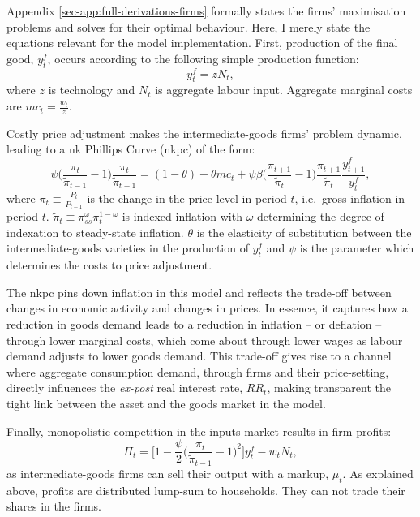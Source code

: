 \documentclass[a4paper,12pt]{article} %
\numberwithin{equation}{section} %
\numberwithin{figure}{section}
\numberwithin{table}{section}
\begin{document}
Appendix \ref{sec-app:full-derivations-firms} formally states the firms' maximisation problems and solves for their optimal behaviour. Here, I merely state the equations relevant for the model implementation. First, production of the final good, $y_t^f$, occurs according to the following simple production function:
\begin{equation}
    y_t^f = z N_t, \label{eq:firms-production}
\end{equation}
where $z$ is technology and $N_t$ is aggregate labour input. Aggregate marginal costs are $mc_t = \frac{w_t}{z}$. 

Costly price adjustment makes the intermediate-goods firms' problem dynamic, leading to a \Gls{nk} Phillips Curve (\Gls{nkpc}) of the form:
\begin{equation}
    \psi \Bigg( \frac{\pi_t}{\tilde{\pi}_{t-1}} - 1 \Bigg) \frac{\pi_t}{\tilde{\pi}_{t-1}} = (1-\theta) + \theta mc_t + \psi \beta \Bigg( \frac{\pi_{t+1}}{\tilde{\pi}_{t}} - 1 \Bigg) \frac{\pi_{t+1}}{\tilde{\pi}_{t}} \frac{y_{t+1}^f}{y_t^f}, \label{eq:firms-nkpc}
\end{equation}
where $\pi_t \equiv \frac{P_t}{P_{t-1}}$ is the change in the price level in period $t$, i.e.~gross inflation in period $t$. $\tilde{\pi}_t \equiv \pi_{ss}^{\omega} \pi_{t}^{1-\omega}$ is indexed inflation with $\omega$ determining the degree of indexation to steady-state inflation. $\theta$ is the elasticity of substitution between the intermediate-goods varieties in the production of $y_t^f$ and $\psi$ is the parameter which determines the costs to price adjustment.  

The \Gls{nkpc} pins down inflation in this model and reflects the trade-off between changes in economic activity and changes in prices. In essence, it captures how a reduction in goods demand leads to a reduction in inflation -- or deflation -- through lower marginal costs, which come about through lower wages as labour demand adjusts to lower goods demand. This trade-off gives rise to a channel where aggregate consumption demand, through firms and their price-setting, directly influences the \textit{ex-post} real interest rate, $RR_t$, making transparent the tight link between the asset and the goods market in the model.

Finally, monopolistic competition in the inputs-market results in firm profits:
\begin{equation}
    \Pi_t = \Bigg[ 1 - \frac{\psi}{2} \Bigg( \frac{\pi_t}{\tilde{\pi}_{t-1}} - 1 \Bigg)^2 \Bigg] y_t^f - w_t N_t, \label{eq:firms-profits}
\end{equation}
as intermediate-goods firms can sell their output with a markup, $\mu_t$. As explained above, profits are distributed lump-sum to households. They can not trade their shares in the firms.
\end{document}
